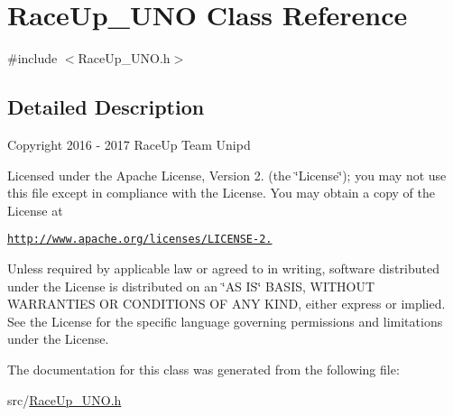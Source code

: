 \hypertarget{class_race_up___u_n_o}{}\section{Race\+Up\+\_\+\+U\+NO Class Reference}
\label{class_race_up___u_n_o}


{\ttfamily \#include $<$Race\+Up\+\_\+\+U\+N\+O.\+h$>$}



\subsection{Detailed Description}
Copyright 2016 -\/ 2017 Race\+Up Team Unipd

Licensed under the Apache License, Version 2. (the \char`\"{}\+License\char`\"{}); you may not use this file except in compliance with the License. You may obtain a copy of the License at

\href{http://www.apache.org/licenses/LICENSE-2.0}{\tt http\+://www.\+apache.\+org/licenses/\+L\+I\+C\+E\+N\+S\+E-\/2.}

Unless required by applicable law or agreed to in writing, software distributed under the License is distributed on an \char`\"{}\+A\+S I\+S\char`\"{} B\+A\+S\+IS, W\+I\+T\+H\+O\+UT W\+A\+R\+R\+A\+N\+T\+I\+ES OR C\+O\+N\+D\+I\+T\+I\+O\+NS OF A\+NY K\+I\+ND, either express or implied. See the License for the specific language governing permissions and limitations under the License. 

The documentation for this class was generated from the following file\+:\begin{DoxyCompactItemize}
\item 
src/\hyperlink{_race_up___u_n_o_8h}{Race\+Up\+\_\+\+U\+N\+O.\+h}\end{DoxyCompactItemize}
